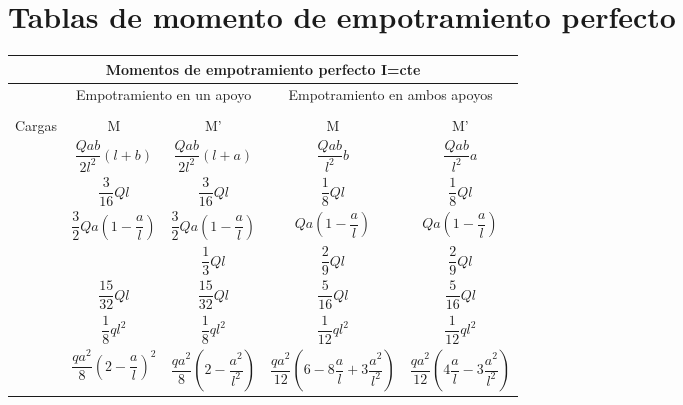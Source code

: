 
\clearpage
\section{Tablas de momento de empotramiento perfecto}

\begin{table}[H]
    \centering
    \resizebox{0.95\textwidth}{!}
    {
    \begin{tabular}{m{4cm}cccc}
         \multicolumn{5}{c}{\Large Momentos de empotramiento perfecto I=cte} \\ \toprule
         & \multicolumn{2}{c}{\large Empotramiento en un apoyo} & \multicolumn{2}{c}{\large Empotramiento en ambos apoyos} \\ \cmidrule{2-5} 
         &   &  & \multicolumn{2}{c}{} \\ \cmidrule{1-5}
        \multicolumn{1}{c}{\large{Cargas}} & \large{M} & \large{M'} & \large{M} & \large{M'} \\ \midrule
         & \large{$\dfrac{Qab}{2l^2}(l+b)$} &  \large{$\dfrac{Qab}{2l^2}(l+a)$} & \large{$\dfrac{Qab}{l^2}b$} & \large{$\dfrac{Qab}{l^2}a$} \\ \midrule
         & \large{$\dfrac{3}{16}Ql$} & \large{$\dfrac{3}{16}Ql$} & \large{$\dfrac{1}{8}Ql$} & \large{$\dfrac{1}{8}Ql$} \\ \midrule
         & \large{$\dfrac{3}{2}Qa\left(1-\dfrac{a}{l}\right)$} & \large{$\dfrac{3}{2}Qa\left(1-\dfrac{a}{l}\right)$} & \large{$Qa\left(1-\dfrac{a}{l}\right)$} & \large{$Qa\left(1-\dfrac{a}{l}\right)$} \\ \midrule
         & \large{$\dfrac{1}{3}Ql$ & $\dfrac{1}{3}Ql$} & \large{$\dfrac{2}{9}Ql$} & \large{$\dfrac{2}{9}Ql$} \\ \midrule
         & \large{$\dfrac{15}{32}Ql$} & \large{$\dfrac{15}{32}Ql$} & \large{$\dfrac{5}{16}Ql$} & \large{$\dfrac{5}{16}Ql$} \\ \midrule
         & \large{$\dfrac{1}{8}ql^2$} & \large{$\dfrac{1}{8}ql^2$} & \large{$\dfrac{1}{12}ql^2$} & \large{$\dfrac{1}{12}ql^2$} \\ \midrule
         & \large{$\dfrac{qa^2}{8}\left(2-\dfrac{a}{l}\right)^2$} & \large{$\dfrac{qa^2}{8}\left(2-\dfrac{a^2}{l^2}\right)$} & \large{$\dfrac{qa^2}{12}\left(6-8\dfrac{a}{l}+3\dfrac{a^2}{l^2}\right)$} & \large{$\dfrac{qa^2}{12}\left(4\dfrac{a}{l}-3\dfrac{a^2}{l^2}\right)$} \\ \midrule

\end{tabular}}
\end{table}
